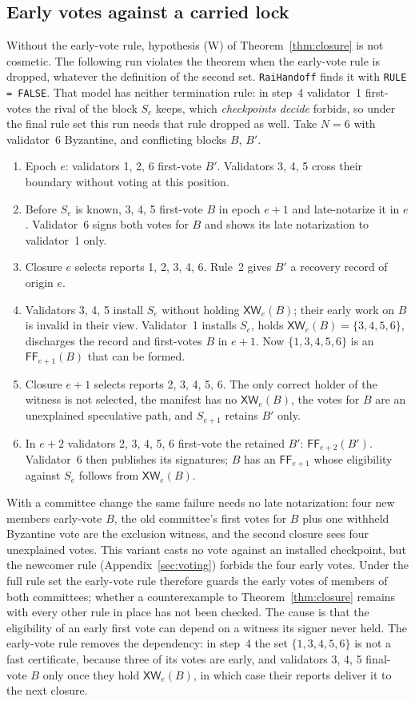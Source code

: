 \documentclass[conference]{IEEEtran}
\newcommand{\XW}{\mathsf{XW}}
\newcommand{\FF}{\mathsf{FF}}
\begin{document}
\subsection{Early votes against a carried lock}
\label{app:open}
Without the early-vote rule, hypothesis (W) of Theorem~\ref{thm:closure} is not cosmetic. The following run violates the theorem when the early-vote rule is dropped, whatever the definition of the second set. \texttt{RaiHandoff} finds it with \texttt{RULE = FALSE}. That model has neither termination rule: in step~4 validator~1 first-votes the rival of the block $S_e$ keeps, which \emph{checkpoints decide} forbids, so under the final rule set this run needs that rule dropped as well. Take $N=6$ with validator~6 Byzantine, and conflicting blocks $B$, $B'$.
\begin{enumerate}
\item Epoch $e$: validators 1, 2, 6 first-vote $B'$. Validators 3, 4, 5 cross their boundary without voting at this position.
\item Before $S_e$ is known, 3, 4, 5 first-vote $B$ in epoch $e+1$ and late-notarize it in $e$. Validator~6 signs both votes for $B$ and shows its late notarization to validator~1 only.
\item Closure $e$ selects reports 1, 2, 3, 4, 6. Rule~2 gives $B'$ a recovery record of origin $e$.
\item Validators 3, 4, 5 install $S_e$ without holding $\XW_e(B)$; their early work on $B$ is invalid in their view. Validator~1 installs $S_e$, holds $\XW_e(B)=\{3,4,5,6\}$, discharges the record and first-votes $B$ in $e+1$. Now $\{1,3,4,5,6\}$ is an $\FF_{e+1}(B)$ that can be formed.
\item Closure $e+1$ selects reports 2, 3, 4, 5, 6. The only correct holder of the witness is not selected, the manifest has no $\XW_e(B)$, the votes for $B$ are an unexplained speculative path, and $S_{e+1}$ retains $B'$ only.
\item In $e+2$ validators 2, 3, 4, 5, 6 first-vote the retained $B'$: $\FF_{e+2}(B')$. Validator~6 then publishes its signatures; $B$ has an $\FF_{e+1}$ whose eligibility against $S_e$ follows from $\XW_e(B)$.
\end{enumerate}
With a committee change the same failure needs no late notarization: four new members early-vote $B$, the old committee's first votes for $B$ plus one withheld Byzantine vote are the exclusion witness, and the second closure sees four unexplained votes. This variant casts no vote against an installed checkpoint, but the newcomer rule (Appendix~\ref{sec:voting}) forbids the four early votes. Under the full rule set the early-vote rule therefore guards the early votes of members of both committees; whether a counterexample to Theorem~\ref{thm:closure} remains with every other rule in place has not been checked. The cause is that the eligibility of an early first vote can depend on a witness its signer never held. The early-vote rule removes the dependency: in step~4 the set $\{1,3,4,5,6\}$ is not a fast certificate, because three of its votes are early, and validators 3, 4, 5 final-vote $B$ only once they hold $\XW_e(B)$, in which case their reports deliver it to the next closure.
\end{document}
